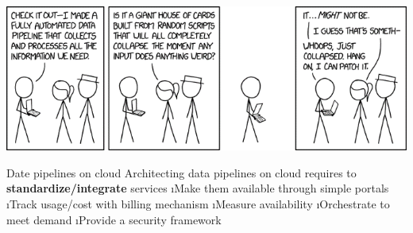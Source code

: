 


\begin{frame}{}
\includegraphics[width=\linewidth]{imgs/xkcd_pipeline.png}    
\end{frame}

\begin{frame}{Date pipelines on cloud}
Architecting data pipelines on cloud requires to \textbf{standardize/integrate} services
\i Make them available through simple portals
\i Track usage/cost with billing mechanism
\i Measure availability
\i Orchestrate to meet demand
\i Provide a security framework
\end{frame}

